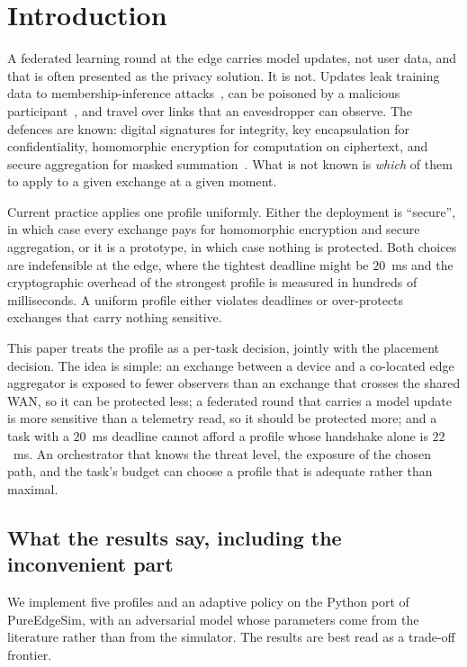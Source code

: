 \documentclass[journal,10pt]{IEEEtran}
\begin{document}
\section{Introduction}
\label{sec:intro}

A federated learning round at the edge carries model updates, not user data,
and that is often presented as the privacy solution. It is not. Updates leak
training data to membership-inference attacks~\cite{shokri2017membership}, can
be poisoned by a malicious participant~\cite{biggio2012poisoning}, and travel
over links that an eavesdropper can observe. The defences are known: digital
signatures for integrity, key encapsulation for confidentiality,
homomorphic encryption for computation on ciphertext, and secure aggregation
for masked summation~\cite{bonawitz2017secagg,cheon2017ckks}. What is not known
is \emph{which} of them to apply to a given exchange at a given moment.

Current practice applies one profile uniformly. Either the deployment is
``secure'', in which case every exchange pays for homomorphic encryption and
secure aggregation, or it is a prototype, in which case nothing is protected.
Both choices are indefensible at the edge, where the tightest deadline might be
$20$~ms and the cryptographic overhead of the strongest profile is measured in
hundreds of milliseconds. A uniform profile either violates deadlines or
over-protects exchanges that carry nothing sensitive.

This paper treats the profile as a per-task decision, jointly with the placement
decision. The idea is simple: an exchange between a device and a co-located edge
aggregator is exposed to fewer observers than an exchange that crosses the
shared WAN, so it can be protected less; a federated round that carries a model
update is more sensitive than a telemetry read, so it should be protected more;
and a task with a $20$~ms deadline cannot afford a profile whose handshake alone
is $22$~ms. An orchestrator that knows the threat level, the exposure of the
chosen path, and the task's budget can choose a profile that is adequate rather
than maximal.

\subsection{What the results say, including the inconvenient part}
We implement five profiles and an adaptive policy on the Python port of
PureEdgeSim, with an adversarial model whose parameters come from the
literature rather than from the simulator. The results are best read as a
trade-off frontier.
\end{document}
